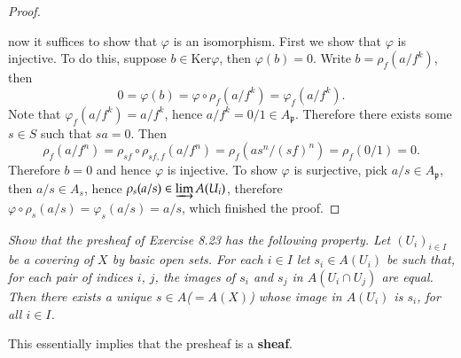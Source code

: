 \begin{proof}
\begin{center}
\end{center}
now it suffices to show that $\varphi$ is an isomorphism. First we show that $\varphi$ is injective. To do this, suppose $b\in\mathrm{Ker}\varphi$, then $\varphi(b)=0$. Write $b=\rho_f(a/f^k)$, then 
$$
0=\varphi(b)=\varphi\circ\rho_f(a/f^k)=\varphi_f(a/f^k).
$$
Note that $\varphi_f(a/f^k)=a/f^k$, hence $a/f^k=0/1\in A_\mathfrak{p}$. Therefore there exists some $s\in S$ such that $sa=0$. Then 
$$
\rho _f\left( a/f^n \right) =\rho _{sf}\circ \rho _{sf,f}\left( a/f^n \right) =\rho _f\left( as^n/\left( sf \right) ^n \right) =\rho _f\left( 0/1 \right) =0.
$$
Therefore $b=0$ and hence $\varphi$ is injective. To show $\varphi$ is surjective, pick $a/s\in A_\mathfrak{p}$, then $a/s\in A_s$, hence $\rho_s(a/s)\in\varinjlim A(U_i)$, therefore $\varphi\circ\rho_s(a/s)=\varphi_s(a/s)=a/s$, which finished the proof.
\end{proof}
\begin{problem}\em
Show that the presheaf of Exercise 8.23 has the following property. Let $(U_i)_{i\in I}$ be a covering of $X$ by basic open sets. For each $i\in I$ let $s_i\in A(U_i)$ be such that, for each pair of indices $i$, $j$, the images of $s_i$ and $s_j$ in $A(U_i\cap U_j)$ are equal. Then there exists a unique $s\in A$($=A(X)$) whose image in $A(U_i)$ is $s_i$, for all $i\in I$.\par
This essentially implies that the presheaf is a \textbf{sheaf}.
\end{problem}